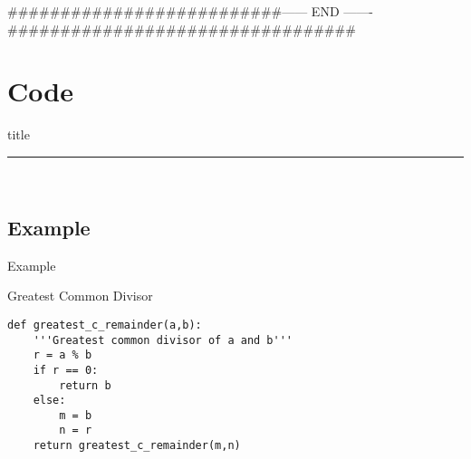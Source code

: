 
##########################------   END  -------#################################

\section{Code}
    \begin{frame}[plain]
        \vfill
      \centering
      \begin{beamercolorbox}[sep=8pt,center,shadow=true,rounded=true]{title}
        \insertsectionhead\par%
        \color{oxfordblue}\noindent\rule{10cm}{1pt} \\
        \LARGE{\faFileCodeO}
      \end{beamercolorbox}
      \vfill
  \end{frame}

\subsection{Example}
\begin{frame}[fragile]{Example}
\begin{block}{Greatest Common Divisor}
\begin{lstlisting}[firstnumber=1, label=glabels, xleftmargin=10pt]
def greatest_c_remainder(a,b):
	'''Greatest common divisor of a and b'''
	r = a % b
	if r == 0:
		return b
	else:
		m = b
		n = r
	return greatest_c_remainder(m,n)

\end{lstlisting}
\end{block}
\end{frame}

